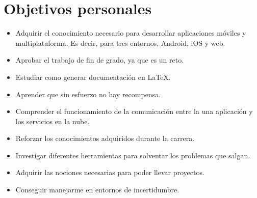 \section{Objetivos personales}
\begin{itemize}
	\item Adquirir el conocimiento necesario para desarrollar aplicaciones móviles y multiplataforma. Es decir, para tres entornos, Android, iOS y web.
	\item Aprobar el trabajo de fin de grado, ya que es un reto.
	\item Estudiar como generar documentación en \LaTeX.
	\item Aprender que sin esfuerzo no hay recompensa.
	\item Comprender el funcionamiento de la comunicación entre la una aplicación y los servicios en la nube.
	\item Reforzar los conocimientos adquiridos durante la carrera.
	\item Investigar diferentes herramientas para solventar los problemas que salgan.
	\item Adquirir las nociones necesarias para poder llevar proyectos.
	\item Conseguir manejarme en entornos de incertidumbre.
\end{itemize}